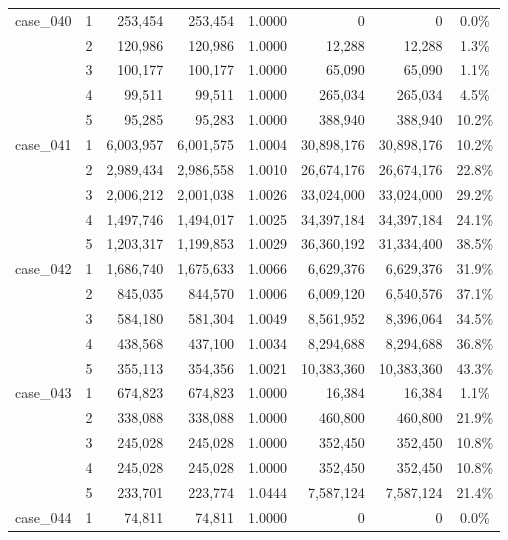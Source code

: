 \begin{footnotesize}
\begin{longtable}{l c rr c rr c}
\addlinespace[2pt]
case\_040 & 1 & 253{,}454 & 253{,}454 & 1.0000 & 0 & 0 & 0.0\% \\
 & 2 & 120{,}986 & 120{,}986 & 1.0000 & 12{,}288 & 12{,}288 & 1.3\% \\
 & 3 & 100{,}177 & 100{,}177 & 1.0000 & 65{,}090 & 65{,}090 & 1.1\% \\
 & 4 & 99{,}511 & 99{,}511 & 1.0000 & 265{,}034 & 265{,}034 & 4.5\% \\
 & 5 & 95{,}285 & 95{,}283 & 1.0000 & 388{,}940 & 388{,}940 & 10.2\% \\
\addlinespace[2pt]
case\_041 & 1 & 6{,}003{,}957 & 6{,}001{,}575 & 1.0004 & 30{,}898{,}176 & 30{,}898{,}176 & 10.2\% \\
 & 2 & 2{,}989{,}434 & 2{,}986{,}558 & 1.0010 & 26{,}674{,}176 & 26{,}674{,}176 & 22.8\% \\
 & 3 & 2{,}006{,}212 & 2{,}001{,}038 & 1.0026 & 33{,}024{,}000 & 33{,}024{,}000 & 29.2\% \\
 & 4 & 1{,}497{,}746 & 1{,}494{,}017 & 1.0025 & 34{,}397{,}184 & 34{,}397{,}184 & 24.1\% \\
 & 5 & 1{,}203{,}317 & 1{,}199{,}853 & 1.0029 & 36{,}360{,}192 & 31{,}334{,}400 & 38.5\% \\
\addlinespace[2pt]
case\_042 & 1 & 1{,}686{,}740 & 1{,}675{,}633 & 1.0066 & 6{,}629{,}376 & 6{,}629{,}376 & 31.9\% \\
 & 2 & 845{,}035 & 844{,}570 & 1.0006 & 6{,}009{,}120 & 6{,}540{,}576 & 37.1\% \\
 & 3 & 584{,}180 & 581{,}304 & 1.0049 & 8{,}561{,}952 & 8{,}396{,}064 & 34.5\% \\
 & 4 & 438{,}568 & 437{,}100 & 1.0034 & 8{,}294{,}688 & 8{,}294{,}688 & 36.8\% \\
 & 5 & 355{,}113 & 354{,}356 & 1.0021 & 10{,}383{,}360 & 10{,}383{,}360 & 43.3\% \\
\addlinespace[2pt]
case\_043 & 1 & 674{,}823 & 674{,}823 & 1.0000 & 16{,}384 & 16{,}384 & 1.1\% \\
 & 2 & 338{,}088 & 338{,}088 & 1.0000 & 460{,}800 & 460{,}800 & 21.9\% \\
 & 3 & 245{,}028 & 245{,}028 & 1.0000 & 352{,}450 & 352{,}450 & 10.8\% \\
 & 4 & 245{,}028 & 245{,}028 & 1.0000 & 352{,}450 & 352{,}450 & 10.8\% \\
 & 5 & 233{,}701 & 223{,}774 & 1.0444 & 7{,}587{,}124 & 7{,}587{,}124 & 21.4\% \\
\addlinespace[2pt]
case\_044 & 1 & 74{,}811 & 74{,}811 & 1.0000 & 0 & 0 & 0.0\% \\

\end{longtable}
\end{footnotesize}
